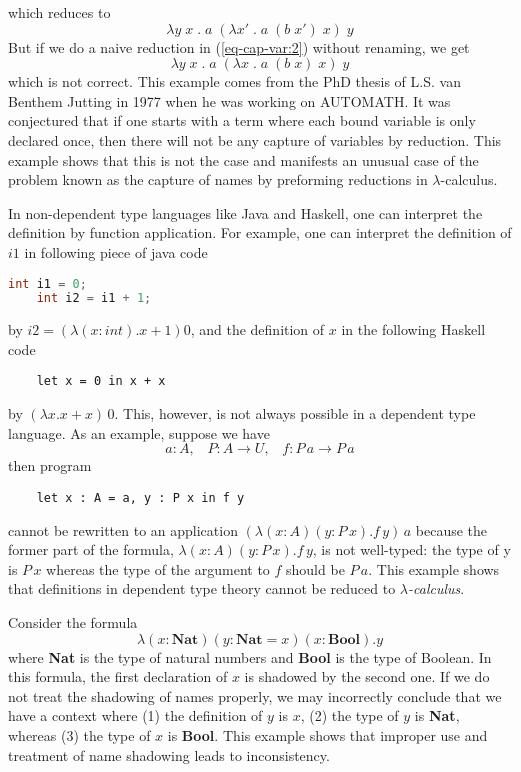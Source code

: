 \begin{example}
  which reduces to
  \[ \lambda y \; x \; . \; a \; (\lambda x' \; . \; a \; (b \; x') \; x) \; y \]
  But if we do a naive reduction in (\ref{eq-cap-var:2}) without renaming, we get 
  \[ \lambda y \; x \; . \; a \; (\lambda x \; . \; a \; (b \; x) \; x) \; y \]
  which is not correct. This example comes from the PhD thesis of L.S. van Benthem Jutting in 1977\cite{van1994checking} when he was working on AUTOMATH. It was conjectured that if one starts with a term where each bound variable is only declared once, then there will not be any capture of variables by reduction. This example shows that this is not the case and manifests an unusual case of the problem known as the capture of names by preforming reductions in $\lambda$-calculus.
\end{example}

\begin{example}\label{theory:example-2}
  In non-dependent type languages like Java and Haskell, one can interpret the definition by function application. For example, one can interpret the definition of $i1$ in following piece of java code
  \begin{lstlisting}[language=java]
    int i1 = 0;
    int i2 = i1 + 1;
  \end{lstlisting}
  by $i2 = (\lambda (x:int).x + 1)0$, and the definition of $x$ in the following Haskell code
  \begin{lstlisting}
    let x = 0 in x + x
  \end{lstlisting}
  by $(\lambda x.x + x)\,0$. This, however, is not always possible in a dependent type language. As an example, suppose we have
  \[ a : A, \;\;\; P : A \to U, \;\;\; f : P \, a \to P \, a \]
  then program
  \begin{lstlisting}
    let x : A = a, y : P x in f y
  \end{lstlisting}
  cannot be rewritten to an application $(\lambda (x : A) (y : P\,x) . f\,y)\,a$ because the former part of the formula, $\lambda (x : A) (y : P\,x) . f\,y$, is not well-typed: the type of y is $P\,x$ whereas the type of the argument to $f$ should be $P\,a$. 
This example shows that definitions in dependent type theory cannot be reduced to \emph{$\lambda$-calculus}.
\end{example}

\begin{example}\label{theory:example-3}
  Consider the formula
  \[ \lambda (x : \textbf{Nat}) (y : \textbf{Nat} = x) (x : \textbf{Bool}).y\]
  where \textbf{Nat} is the type of natural numbers and \textbf{Bool} is the type of Boolean. In this formula, the first declaration of $x$ is shadowed by the second one. If we do not treat the shadowing of names properly, we may incorrectly conclude that we have a context where (1) the definition of $y$ is $x$, (2) the type of $y$ is \textbf{Nat}, whereas (3) the type of $x$ is \textbf{Bool}. This example shows that improper use and treatment of name shadowing leads to inconsistency.
\end{example}


